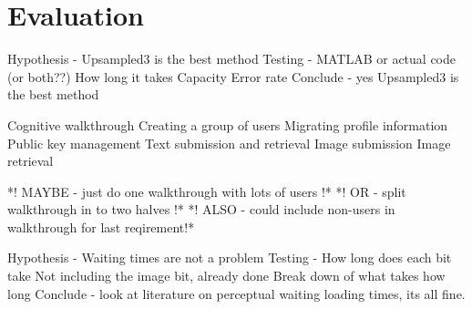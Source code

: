 \chapter{Evaluation}\label{ch:evaluation}

Hypothesis - Upsampled3 is the best method
Testing -	MATLAB or actual code (or both??) 	
                How long it takes
                Capacity
                Error rate
Conclude - yes Upsampled3 is the best method

Cognitive walkthrough 
        Creating a group of users
        Migrating profile information
        Public key management
        Text submission and retrieval
        Image submission
        Image retrieval

*! MAYBE - just do one walkthrough with lots of users !*
*! OR - split walkthrough in to two halves !*
*! ALSO - could include non-users in walkthrough for last reqirement!*

Hypothesis - Waiting times are not a problem
Testing -	How long does each bit take
                Not including the image bit, already done
                Break down of what takes how long
Conclude - look at literature on perceptual waiting loading times, its all fine.
